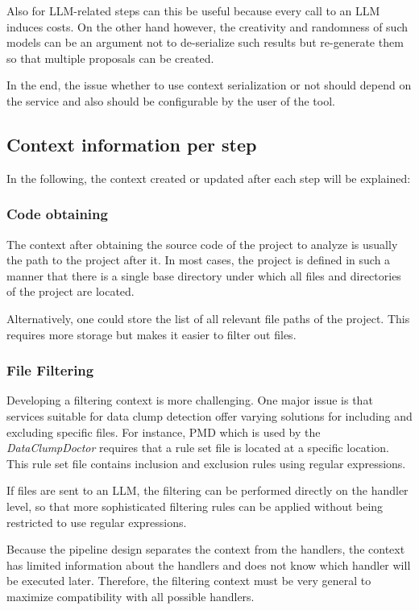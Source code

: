 Also for \ac{LLM}-related steps can this be useful because every call to an \ac{LLM} induces costs. On the other hand however, the creativity and randomness of such models can be an argument not to de-serialize such results but re-generate them so that multiple proposals can be created.

In the end, the issue whether to use context serialization or not should depend on the service and also should be configurable by the user of the tool. 

\subsection{Context information per step}
In the following, the context created or updated after each step will be explained:

\subsubsection{Code obtaining}
The context after obtaining the source code of the project to analyze is usually the path to the project after it. In most cases, the project is defined in such a manner that there is a single base directory under which all files and directories of the project are located.

Alternatively, one could store the list of all relevant file paths of the project. This requires more storage but makes it easier to filter out files. 

\subsubsection{File Filtering}
Developing a filtering context is more challenging. One major issue is that services suitable for data clump detection offer varying solutions for including and excluding specific files. For instance, PMD which is used by the \textit{DataClumpDoctor} requires that a rule set file is located at a specific location. This rule set file contains inclusion and exclusion rules using regular expressions. 

If files are sent to an \ac{LLM}, the filtering can be performed directly on the handler level, so that more sophisticated  filtering rules can be applied without being restricted to use regular expressions. 

Because the pipeline design separates the context from the handlers, the context has limited information about the handlers and does not know which handler will be executed later. Therefore, the filtering context must be very general to maximize compatibility with all possible handlers. 

